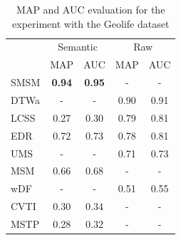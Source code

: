 \documentclass[12pt]{article}
\begin{document}

\begin{table}[ht!]
  \scriptsize
  \centering
  \begin{tabular}{|l|c|c|c|c|}
  	\hline
 & \multicolumn{2}{c}{Semantic}& \multicolumn{2}{|c|}{Raw}\\
 	\cline{2-5}
 & MAP & AUC & MAP & AUC\\
  	\hline
SMSM & \textbf{0.94} & \textbf{0.95} & - & -\\
DTWa & - & - & 0.90 & 0.91\\
LCSS & 0.27 & 0.30 & 0.79 & 0.81\\
 EDR & 0.72 & 0.73 & 0.78 & 0.81\\
 UMS & - & - & 0.71 & 0.73\\
 MSM & 0.66 & 0.68 & - & -\\
 wDF & - & - & 0.51 & 0.55\\
CVTI & 0.30 & 0.34 & - & -\\
MSTP & 0.28 & 0.32 & - & -\\
    \hline
  \end{tabular}
  \caption{MAP and AUC evaluation for the experiment with the Geolife dataset}
  \label{tab:geolife_measures_map_auc}
\end{table}
\end{document}
